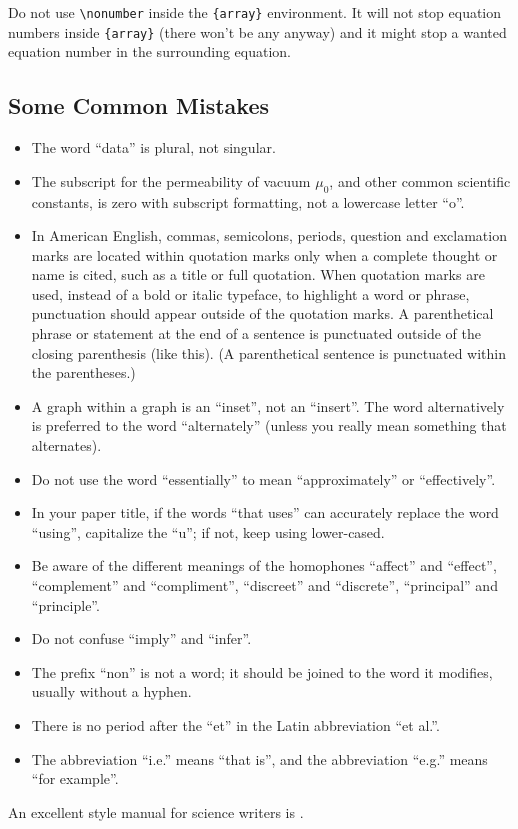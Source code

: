 \documentclass[conference]{IEEEtran}
\begin{document}
Do not use \verb|\nonumber| inside the \verb|{array}| environment. It
will not stop equation numbers inside \verb|{array}| (there won't be
any anyway) and it might stop a wanted equation number in the
surrounding equation.

\subsection{Some Common Mistakes}\label{SCM}
\begin{itemize}
\item The word ``data'' is plural, not singular.
\item The subscript for the permeability of vacuum $\mu_{0}$, and other common scientific constants, is zero with subscript formatting, not a lowercase letter ``o''.
\item In American English, commas, semicolons, periods, question and exclamation marks are located within quotation marks only when a complete thought or name is cited, such as a title or full quotation. When quotation marks are used, instead of a bold or italic typeface, to highlight a word or phrase, punctuation should appear outside of the quotation marks. A parenthetical phrase or statement at the end of a sentence is punctuated outside of the closing parenthesis (like this). (A parenthetical sentence is punctuated within the parentheses.)
\item A graph within a graph is an ``inset'', not an ``insert''. The word alternatively is preferred to the word ``alternately'' (unless you really mean something that alternates).
\item Do not use the word ``essentially'' to mean ``approximately'' or ``effectively''.
\item In your paper title, if the words ``that uses'' can accurately replace the word ``using'', capitalize the ``u''; if not, keep using lower-cased.
\item Be aware of the different meanings of the homophones ``affect'' and ``effect'', ``complement'' and ``compliment'', ``discreet'' and ``discrete'', ``principal'' and ``principle''.
\item Do not confuse ``imply'' and ``infer''.
\item The prefix ``non'' is not a word; it should be joined to the word it modifies, usually without a hyphen.
\item There is no period after the ``et'' in the Latin abbreviation ``et al.''.
\item The abbreviation ``i.e.'' means ``that is'', and the abbreviation ``e.g.'' means ``for example''.
\end{itemize}
An excellent style manual for science writers is \cite{b7}.
\end{document}
